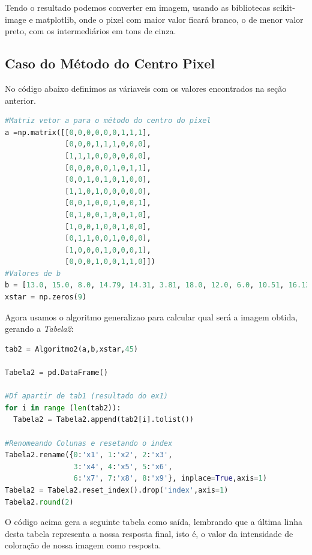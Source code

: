 \documentclass[a4paper, 12pt]{article}
\begin{document}
Tendo o resultado podemos converter em imagem, usando as bibliotecas scikit-image e matplotlib, onde o pixel com maior valor ficará branco, o de menor valor preto, com os intermediários em tons de cinza.

\subsection{Caso do Método do Centro Pixel}

No código abaixo definimos as váriaveis com os valores encontrados na seção anterior.\\

\begin{lstlisting}[language=Python, caption=Definindo variáveis: Método do Centro do Pixel, label=Definindo variáveis: Método do Centro do Pixel]
#Matriz vetor a para o método do centro do pixel
a =np.matrix([[0,0,0,0,0,0,1,1,1],
              [0,0,0,1,1,1,0,0,0],
              [1,1,1,0,0,0,0,0,0],
              [0,0,0,0,0,1,0,1,1],
              [0,0,1,0,1,0,1,0,0],
              [1,1,0,1,0,0,0,0,0],
              [0,0,1,0,0,1,0,0,1],
              [0,1,0,0,1,0,0,1,0],
              [1,0,0,1,0,0,1,0,0],
              [0,1,1,0,0,1,0,0,0],
              [1,0,0,0,1,0,0,0,1],
              [0,0,0,1,0,0,1,1,0]])
#Valores de b
b = [13.0, 15.0, 8.0, 14.79, 14.31, 3.81, 18.0, 12.0, 6.0, 10.51, 16.13, 7.04]
xstar = np.zeros(9)   
\end{lstlisting}

Agora usamos o algoritmo generalizao para calcular qual será a imagem obtida, gerando a \textit{Tabela2}:\\

\begin{lstlisting}[language=Python, caption=Método do centro do Pixel: Construindo a imagem, label=Método do centro do Pixel: Construindo a imagem]
tab2 = Algoritmo2(a,b,xstar,45)

Tabela2 = pd.DataFrame()

#Df apartir de tab1 (resultado do ex1)
for i in range (len(tab2)):
  Tabela2 = Tabela2.append(tab2[i].tolist())

#Renomeando Colunas e resetando o index
Tabela2.rename({0:'x1', 1:'x2', 2:'x3', 
                3:'x4', 4:'x5', 5:'x6',
                6:'x7', 7:'x8', 8:'x9'}, inplace=True,axis=1)
Tabela2 = Tabela2.reset_index().drop('index',axis=1)
Tabela2.round(2)
\end{lstlisting}

O código acima gera a seguinte tabela como saída, lembrando que a última linha desta tabela representa a nossa resposta final, isto é, o valor da intensidade de coloração de nossa imagem como resposta.
\end{document}
